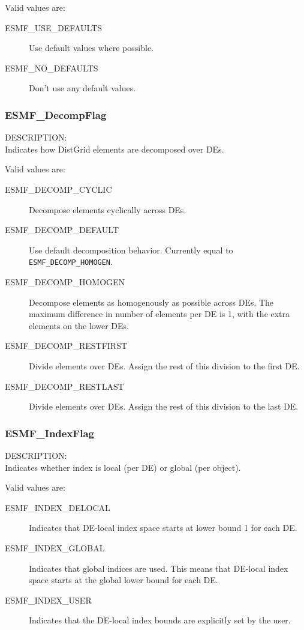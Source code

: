 Valid values are:
\begin{description}
\item [ESMF\_USE\_DEFAULTS]
      Use default values where possible.
\item [ESMF\_NO\_DEFAULTS]
      Don't use any default values.
\end{description}

\subsubsection{ESMF\_DecompFlag}
\label{opt:decompflag}
{\sf DESCRIPTION:\\}
Indicates how DistGrid elements are decomposed over DEs.

Valid values are:
\begin{description}
\item [ESMF\_DECOMP\_CYCLIC]
      Decompose elements cyclically across DEs.
\item [ESMF\_DECOMP\_DEFAULT]
      Use default decomposition behavior. Currently equal to 
      {\tt ESMF\_DECOMP\_HOMOGEN}.
\item [ESMF\_DECOMP\_HOMOGEN]
      Decompose elements as homogenously as possible across DEs. The maximum 
      difference in number of elements per DE is 1, with the extra elements on
      the lower DEs.
\item [ESMF\_DECOMP\_RESTFIRST]
      Divide elements over DEs. Assign the rest of this division to the first
      DE.
\item [ESMF\_DECOMP\_RESTLAST]
      Divide elements over DEs. Assign the rest of this division to the last DE.
\end{description}

\subsubsection{ESMF\_IndexFlag}
\label{opt:indexflag}
{\sf DESCRIPTION:\\}
Indicates whether index is local (per DE) or global (per object).

Valid values are:
\begin{description}
\item [ESMF\_INDEX\_DELOCAL]
      Indicates that DE-local index space starts at lower bound 1 for each DE.
\item [ESMF\_INDEX\_GLOBAL]
      Indicates that global indices are used. This means that DE-local index
      space starts at the global lower bound for each DE.
\item [ESMF\_INDEX\_USER]
      Indicates that the DE-local index bounds are explicitly set by the user.
      
\end{description}

